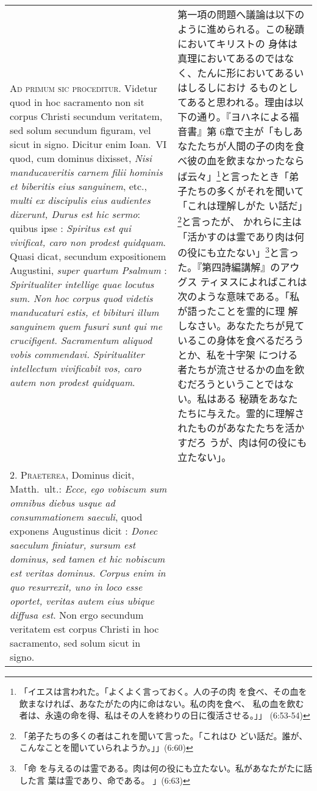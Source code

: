 \documentclass[10pt]{jsarticle} %
\begin{document}
\begin{longtable}{p{21em}p{21em}}

{\scshape Ad primum sic proceditur}. Videtur quod in hoc sacramento
non sit corpus Christi secundum veritatem, sed solum secundum figuram,
vel sicut in signo. Dicitur enim Ioan.~{\scshape VI} quod, cum dominus
dixisset, {\itshape Nisi manducaveritis carnem filii hominis et
biberitis eius sanguinem}, etc., {\itshape multi ex discipulis eius
audientes dixerunt, Durus est hic sermo}: quibus ipse : {\itshape
Spiritus est qui vivificat, caro non prodest quidquam}. Quasi dicat,
secundum expositionem Augustini, {\itshape super quartum Psalmum} :
{\itshape Spiritualiter intellige quae locutus sum. Non hoc corpus
quod videtis manducaturi estis, et bibituri illum sanguinem quem
fusuri sunt qui me crucifigent. Sacramentum aliquod vobis
commendavi. Spiritualiter intellectum vivificabit vos, caro autem non
prodest quidquam}.



&

第一項の問題へ議論は以下のように進められる。この秘蹟においてキリストの
身体は真理においてあるのではなく、たんに形においてあるいはしるしにおけ
るものとしてあると思われる。理由は以下の通り。『ヨハネによる福音書』第
6章で主が「もしあなたたちが人間の子の肉を食べ彼の血を飲まなかったなら
ば云々」\footnote{「イエスは言われた。「よくよく言っておく。人の子の肉
を食べ、その血を飲まなければ、あなたがたの内に命はない。私の肉を食べ、
私の血を飲む者は、永遠の命を得、私はその人を終わりの日に復活させる。」」
(6:53-54)}と言ったとき「弟子たちの多くがそれを聞いて「これは理解しがた
い話だ」\footnote{「弟子たちの多くの者はこれを聞いて言った。「これはひ
どい話だ。誰が、こんなことを聞いていられようか。」」(6:60)}と言ったが、
かれらに主は「活かすのは霊であり肉は何の役にも立たない」\footnote{「命
を与えるのは霊である。肉は何の役にも立たない。私があなたがたに話した言
葉は霊であり、命である。 」(6:63)}と言った。『第四詩編講解』のアウグス
ティヌスによればこれは次のような意味である。「私が語ったことを霊的に理
解しなさい。あなたたちが見ているこの身体を食べるだろうとか、私を十字架
につける者たちが流させるかの血を飲むだろうということではない。私はある
秘蹟をあなたたちに与えた。霊的に理解されたものがあなたたちを活かすだろ
うが、肉は何の役にも立たない」。



\\



2. {\scshape Praeterea}, Dominus dicit, Matth.~ult.: {\itshape Ecce,
ego vobiscum sum omnibus diebus usque ad consummationem saeculi}, quod
exponens Augustinus dicit : {\itshape Donec saeculum finiatur, sursum
est dominus, sed tamen et hic nobiscum est veritas dominus. Corpus
enim in quo resurrexit, uno in loco esse oportet, veritas autem eius
ubique diffusa est}. Non ergo secundum veritatem est corpus Christi in
hoc sacramento, sed solum sicut in signo.



\end{longtable}
\end{document}
